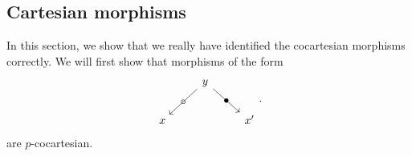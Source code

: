 \documentclass[main.tex]{subfiles}
\begin{document}
\subsection{Cartesian morphisms}
\label{ssc:cartesian_morphisms}

In this section, we show that we really have identified the cocartesian morphisms correctly. We will first show that morphisms of the form
\begin{equation}
  \label{eq:form_of_p_cocartesian_morphisms}
  \begin{tikzcd}
    & y
    \arrow[dl, "\circ" marking]
    \arrow[dr, "\bullet" marking]
    \\
    x
    && x'
  \end{tikzcd}.
\end{equation}
are $p$-cocartesian.
\end{document}
